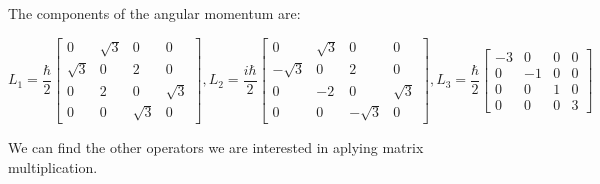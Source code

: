The components of the angular momentum are:

\begin{equation}
  L_1 = \frac{\hbar}{2}\left[\begin{matrix}
    0 & \sqrt{3} & 0 & 0\\
    \sqrt{3} & 0 & 2 & 0\\
    0 & 2 & 0 & \sqrt{3}\\
    0 & 0 & \sqrt{3} & 0
  \end{matrix}\right],
  L_2 = \frac{i\hbar}{2}\left[\begin{matrix}
    0 & \sqrt{3} & 0 & 0\\
    -\sqrt{3} & 0 & 2 & 0\\
    0 & -2 & 0 & \sqrt{3}\\
    0 & 0 & -\sqrt{3} & 0
  \end{matrix}\right],
  L_3 = \frac{\hbar}{2}\left[\begin{matrix}
    -3 & 0 & 0 & 0\\
    0 & -1 & 0 & 0\\
    0 & 0 & 1 & 0\\
    0 & 0 & 0 & 3
  \end{matrix}\right]
\end{equation}

We can find the other operators we are interested in aplying matrix multiplication.

